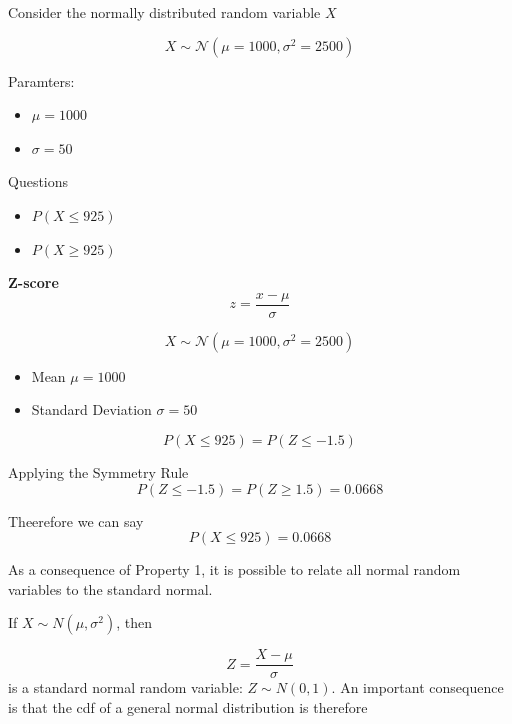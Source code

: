 \documentclass[12pt]{report}
\begin{document}
\Large

Consider the normally distributed random variable $X$

\[ X \sim \mathcal{N}(\mu=1000,\sigma^2 = 2500) \]

Paramters:
\begin{itemize}
	\item $\mu =1000$
	\item $\sigma =50$
\end{itemize}
Questions

\begin{itemize}
	\item $P(X \leq 925)$
	\item $P(X \geq 925)$
\end{itemize}




\textbf{Z-score}
\[ z =\frac{x - \mu}{\sigma}\]

\[ X \sim \mathcal{N}(\mu=1000,\sigma^2 = 2500) \]

\begin{itemize}
	\item Mean $\mu= 1000$
	\item Standard Deviation $\sigma = 50$
\end{itemize}



\[ P(X \leq 925)  = P(Z \leq -1.5) \]

Applying the Symmetry Rule
\[ P(Z \leq -1.5) = P(Z \geq 1.5) = 0.0668\]

Theerefore we can say 
\[ P(X \leq 925) = 0.0668 \]



As a consequence of Property 1, it is possible to relate all normal random variables to the standard normal.

If $X \sim N(\mu, \sigma^2)$, then

\[Z = \frac{X - \mu}{\sigma} \]
is a standard normal random variable: $Z \sim N(0,1)$. An important consequence is that the cdf of a general normal distribution is therefore
\end{document}
